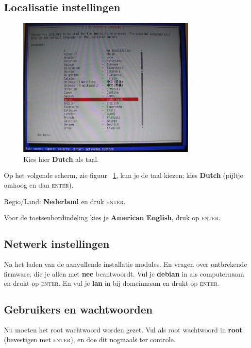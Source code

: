 \documentclass[12pt,a4paper]{article}
\begin{document}
\subsection{Localisatie instellingen}
\begin{figure}[h]
\centering
\includegraphics[width=0.8\textwidth]{taal-keuze-scherm}
\caption{Kies hier \textbf{Dutch} als taal.}
\label{fig:taal-keuze-scherm}
\end{figure}

Op het volgende scherm, zie figuur ~\ref{fig:taal-keuze-scherm},  kun je de taal kiezen; kies \textbf{Dutch} (pijltje omhoog en dan \textsc{enter}).


Regio/Land: \textbf{Nederland} en druk \textsc{enter}.

Voor de toetsenbordindeling kies je \textbf{American English}, druk op \textsc{enter}.

\subsection{Netwerk instellingen}
Na het laden van de aanvullende installatie modules. En vragen over ontbrekende firmware, die je allen met \textbf{nee} beantwoordt. Vul je \textbf{debian} in als computernaam en drukt op \textsc{enter}.
En vul je \textbf{lan} in bij domeinnaam en drukt op \textsc{enter}.

\subsection{Gebruikers en wachtwoorden}
Nu moeten het root wachtwoord worden gezet.
Vul als root wachtwoord in \textbf{root} (bevestigen met \textsc{enter}), en doe dit nogmaals ter controle.
\end{document}
